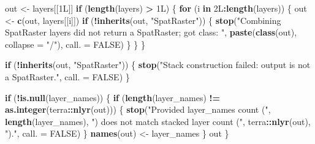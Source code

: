 \documentclass[
]{article}
\newenvironment{Shaded}{\begin{snugshade}}{\end{snugshade}}
\newcommand{\AttributeTok}[1]{\textcolor[rgb]{0.13,0.29,0.53}{#1}}
\newcommand{\ConstantTok}[1]{\textcolor[rgb]{0.56,0.35,0.01}{#1}}
\newcommand{\ControlFlowTok}[1]{\textcolor[rgb]{0.13,0.29,0.53}{\textbf{#1}}}
\newcommand{\DataTypeTok}[1]{\textcolor[rgb]{0.13,0.29,0.53}{#1}}
\newcommand{\DecValTok}[1]{\textcolor[rgb]{0.00,0.00,0.81}{#1}}
\newcommand{\FunctionTok}[1]{\textcolor[rgb]{0.13,0.29,0.53}{\textbf{#1}}}
\newcommand{\NormalTok}[1]{#1}
\newcommand{\OtherTok}[1]{\textcolor[rgb]{0.56,0.35,0.01}{#1}}
\newcommand{\SpecialCharTok}[1]{\textcolor[rgb]{0.81,0.36,0.00}{\textbf{#1}}}
\newcommand{\StringTok}[1]{\textcolor[rgb]{0.31,0.60,0.02}{#1}}
\begin{document}
\begin{Shaded}
\begin{Highlighting}[]
\NormalTok{  out }\OtherTok{\textless{}{-}}\NormalTok{ layers[[}\DecValTok{1}\DataTypeTok{L}\NormalTok{]]}
  \ControlFlowTok{if}\NormalTok{ (}\FunctionTok{length}\NormalTok{(layers) }\SpecialCharTok{\textgreater{}} \DecValTok{1}\DataTypeTok{L}\NormalTok{) \{}
    \ControlFlowTok{for}\NormalTok{ (i }\ControlFlowTok{in} \DecValTok{2}\DataTypeTok{L}\SpecialCharTok{:}\FunctionTok{length}\NormalTok{(layers)) \{}
\NormalTok{      out }\OtherTok{\textless{}{-}} \FunctionTok{c}\NormalTok{(out, layers[[i]])}
      \ControlFlowTok{if}\NormalTok{ (}\SpecialCharTok{!}\FunctionTok{inherits}\NormalTok{(out, }\StringTok{"SpatRaster"}\NormalTok{)) \{}
        \FunctionTok{stop}\NormalTok{(}\StringTok{"Combining SpatRaster layers did not return a SpatRaster; got class: "}\NormalTok{,}
             \FunctionTok{paste}\NormalTok{(}\FunctionTok{class}\NormalTok{(out), }\AttributeTok{collapse =} \StringTok{"/"}\NormalTok{), }\AttributeTok{call. =} \ConstantTok{FALSE}\NormalTok{)}
\NormalTok{      \}}
\NormalTok{    \}}
\NormalTok{  \}}

  \ControlFlowTok{if}\NormalTok{ (}\SpecialCharTok{!}\FunctionTok{inherits}\NormalTok{(out, }\StringTok{"SpatRaster"}\NormalTok{)) \{}
    \FunctionTok{stop}\NormalTok{(}\StringTok{"Stack construction failed: output is not a SpatRaster."}\NormalTok{, }\AttributeTok{call. =} \ConstantTok{FALSE}\NormalTok{)}
\NormalTok{  \}}

  \ControlFlowTok{if}\NormalTok{ (}\SpecialCharTok{!}\FunctionTok{is.null}\NormalTok{(layer\_names)) \{}
    \ControlFlowTok{if}\NormalTok{ (}\FunctionTok{length}\NormalTok{(layer\_names) }\SpecialCharTok{!=} \FunctionTok{as.integer}\NormalTok{(terra}\SpecialCharTok{::}\FunctionTok{nlyr}\NormalTok{(out))) \{}
      \FunctionTok{stop}\NormalTok{(}\StringTok{"Provided layer\_names count ("}\NormalTok{, }\FunctionTok{length}\NormalTok{(layer\_names),}
           \StringTok{") does not match stacked layer count ("}\NormalTok{, terra}\SpecialCharTok{::}\FunctionTok{nlyr}\NormalTok{(out), }\StringTok{")."}\NormalTok{,}
           \AttributeTok{call. =} \ConstantTok{FALSE}\NormalTok{)}
\NormalTok{    \}}
    \FunctionTok{names}\NormalTok{(out) }\OtherTok{\textless{}{-}}\NormalTok{ layer\_names}
\NormalTok{  \}}
\NormalTok{  out}
\NormalTok{\}}


\end{Highlighting}
\end{Shaded}
\end{document}
